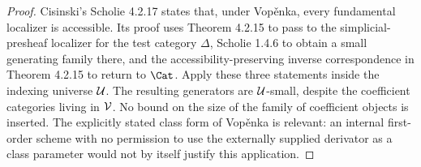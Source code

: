 \begin{proof}
Cisinski's Scholie 4.2.17 states that, under Vop\v{e}nka, every fundamental localizer is accessible. Its proof uses Theorem 4.2.15 to pass to the simplicial-presheaf localizer for the test category $\Delta$, Scholie 1.4.6 to obtain a small generating family there, and the accessibility-preserving inverse correspondence in Theorem 4.2.15 to return to $\Cat$. Apply these three statements inside the indexing universe $\mathcal U$. The resulting generators are $\mathcal U$-small, despite the coefficient categories living in $\mathcal V$. No bound on the size of the family of coefficient objects is inserted. The explicitly stated class form of Vop\v{e}nka is relevant: an internal first-order scheme with no permission to use the externally supplied derivator as a class parameter would not by itself justify this application.
\end{proof}

